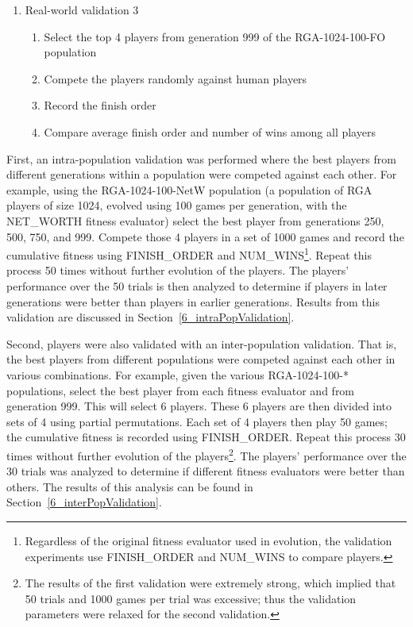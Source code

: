 \begin{enumerate}
\begin{enumerate}
{    the RGA-1024-100-FO population}
    \item {Compete the players randomly against human players}
    \item {Record the finish order}
    \item {Compare average finish order and number of wins among all players}
  \end {enumerate}
  \item {Real-world validation 3}
  \begin{enumerate}
    \item {Select the top 4 players from generation 999 of the RGA-1024-100-FO
    population}
    \item {Compete the players randomly against human players}
    \item {Record the finish order}
    \item {Compare average finish order and number of wins among all players}
  \end {enumerate}
\end{enumerate}

First, an intra-population validation was performed where the best players from
different generations within a population were competed against each other.
For example, using the RGA-1024-100-NetW population (a population of RGA players
of size 1024, evolved using 100 games per generation, with the NET\_WORTH
fitness evaluator) select the best player from generations 250, 500, 750, and
999. Compete those 4 players in a set of 1000 games and record the cumulative
fitness using FINISH\_ORDER and NUM\_WINS\footnote{Regardless of the original
fitness evaluator used in evolution, the validation experiments use
FINISH\_ORDER and NUM\_WINS to compare players.}. Repeat this process 50 times
without further evolution of the players. The players' performance over the 50
trials is then analyzed to determine if players in later generations were better
than players in earlier generations. Results from this validation are discussed
in Section~\ref{6_intraPopValidation}.

Second, players were also validated with an inter-population validation. That
is, the best players from different populations were competed against each other
in various combinations. For example, given the various RGA-1024-100-*
populations, select the best player from each fitness evaluator and from
generation 999. This will select 6 players. These 6 players are then divided
into sets of 4 using partial permutations. Each set of 4 players then play 50
games; the cumulative fitness is recorded using FINISH\_ORDER. Repeat this
process 30 times without further evolution of the players\footnote{The results
of the first validation were extremely strong, which implied that 50 trials and
1000 games per trial was excessive; thus the validation parameters were relaxed
for the second validation.}. The players' performance over the 30 trials was
analyzed to determine if different fitness evaluators were better than others.
The results of this analysis can be found in Section~\ref{6_interPopValidation}.

